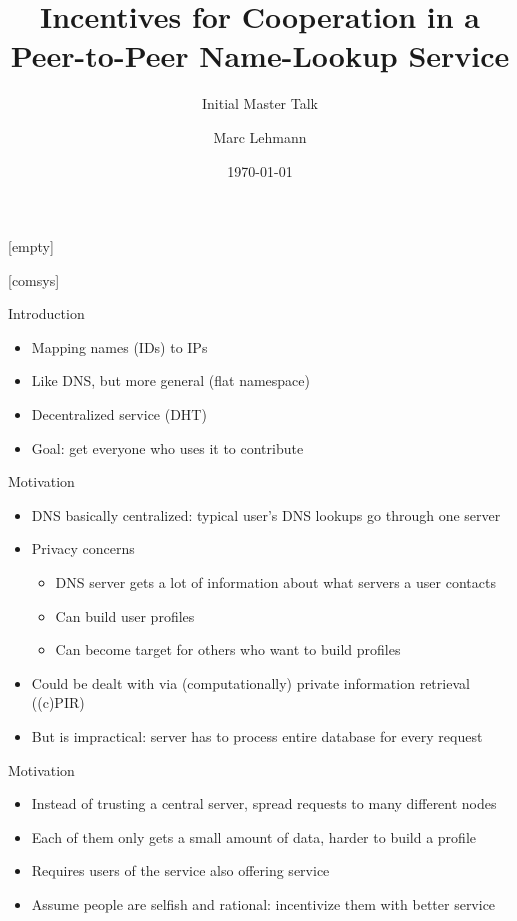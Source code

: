 \documentclass[presentation,english]{beamer}
\title[Peer-to-Peer Incentives]{Incentives for Cooperation in a Peer-to-Peer
Name-Lookup Service}
\author{Marc Lehmann}
\subtitle{Initial Master Talk}
\date{\today}
\begin{document}
[empty]
\begin{frame}
  \titlepage
\end{frame}

[comsys]

\begin{frame}{Introduction}
  \begin{itemize}
    \item Mapping names (IDs) to IPs
    \item Like DNS, but more general (flat namespace)
    \item Decentralized service (DHT)
    \item Goal: get everyone who uses it to contribute
  \end{itemize}
\end{frame}

\begin{frame}{Motivation}
  \begin{itemize}
    \item DNS basically centralized: typical user's DNS lookups go through one
          server
    \item Privacy concerns
    \begin{itemize}
      \item DNS server gets a lot of information about what servers a user
            contacts
      \item Can build user profiles
      \item Can become target for others who want to build profiles
    \end{itemize}
    \item Could be dealt with via (computationally) private information
          retrieval ((c)PIR)
    \item But is impractical: server has to process entire database for every
          request
  \end{itemize}
\end{frame}

\begin{frame}{Motivation}
  \begin{itemize}
    \item Instead of trusting a central server, spread requests to many
          different nodes
    \item Each of them only gets a small amount of data, harder to build a
          profile
    \item Requires users of the service also offering service
    \item Assume people are selfish and rational: incentivize them with better
          service
  \end{itemize}
\end{frame}
\end{document}
